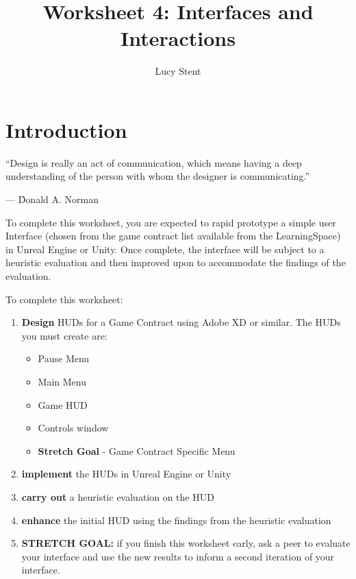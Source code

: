 \documentclass{../../fal_assignment}
\title{Worksheet 4: Interfaces and Interactions}
\author{ Lucy Stent	}
\begin{document}
\maketitle

\section*{Introduction}

\begin{marginquote}
``Design is really an act of communication, which means having a deep understanding of the person with whom the designer is communicating.''
\par --- \'Donald A. Norman
\end{marginquote}

To complete this worksheet, you are expected to rapid prototype a simple user Interface (chosen from the game contract list available from the LearningSpace) in Unreal Engine or Unity. Once complete, the interface will be subject to a heuristic evaluation and then improved upon to accommodate the findings of the evaluation. 

To complete this worksheet: 

\begin{enumerate}[label=(\roman*)]
    \item \textbf{Design} HUDs for a Game Contract using Adobe XD or similar. The HUDs you must create are:
    \begin{itemize}
    	\item Pause Menu
	\item Main Menu
	\item Game HUD
	\item Controls window
	\item \textbf{Stretch Goal} - Game Contract Specific Menu
    \end{itemize}
    \item \textbf{implement} the HUDs in Unreal Engine or Unity
    \item \textbf{carry out} a heuristic evaluation on the HUD 
    \item \textbf{enhance} the initial HUD using the findings from the heuristic evaluation
    \item \textbf{STRETCH GOAL: } if you finish this worksheet early, ask a peer to evaluate your interface and use the new results to inform a second iteration of your interface. 
\end{enumerate}
\end{document}
